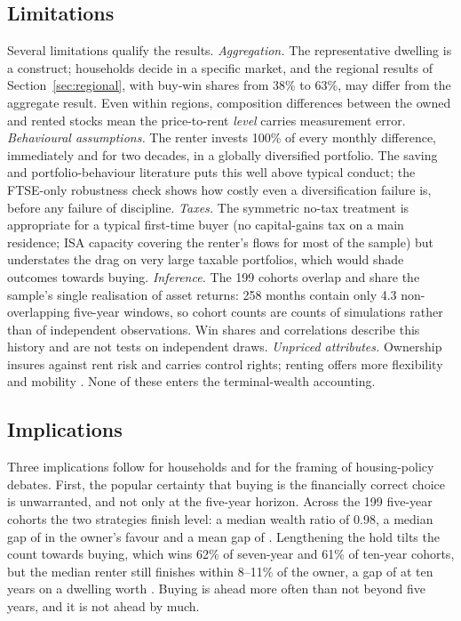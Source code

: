 \subsection{Limitations}

Several limitations qualify the results. \emph{Aggregation.} The representative dwelling is a construct; households decide in a specific market, and the regional results of Section~\ref{sec:regional}, with buy-win shares from 38\% to 63\%, may differ from the aggregate result. Even within regions, composition differences between the owned and rented stocks mean the price-to-rent \emph{level} carries measurement error. \emph{Behavioural assumptions.} The renter invests 100\% of every monthly difference, immediately and for two decades, in a globally diversified portfolio. The saving and portfolio-behaviour literature \parencite{laibson1997,thaler2004} puts this well above typical conduct; the FTSE-only robustness check shows how costly even a diversification failure is, before any failure of discipline. \emph{Taxes.} The symmetric no-tax treatment is appropriate for a typical first-time buyer (no capital-gains tax on a main residence; ISA capacity covering the renter's flows for most of the sample) but understates the drag on very large taxable portfolios, which would shade outcomes towards buying. \emph{Inference.} The 199 cohorts overlap and share the sample's single realisation of asset returns: 258 months contain only 4.3 non-overlapping five-year windows, so cohort counts are counts of simulations rather than of independent observations. Win shares and correlations describe this history and are not tests on independent draws. \emph{Unpriced attributes.} Ownership insures against rent risk \parencite{sinai2005} and carries control rights; renting offers more flexibility and mobility \parencite{ehs2024}. None of these enters the terminal-wealth accounting. 

\subsection{Implications}

Three implications follow for households and for the framing of housing-policy debates. First, the popular certainty that buying is the financially correct choice is unwarranted, and not only at the five-year horizon. Across the 199 five-year cohorts the two strategies finish level: a median wealth ratio of 0.98, a median gap of  in the owner's favour and a mean gap of . Lengthening the hold tilts the count towards buying, which wins 62\% of seven-year and 61\% of ten-year cohorts, but the median renter still finishes within 8--11\% of the owner, a gap of  at ten years on a dwelling worth . Buying is ahead more often than not beyond five years, and it is not ahead by much.

